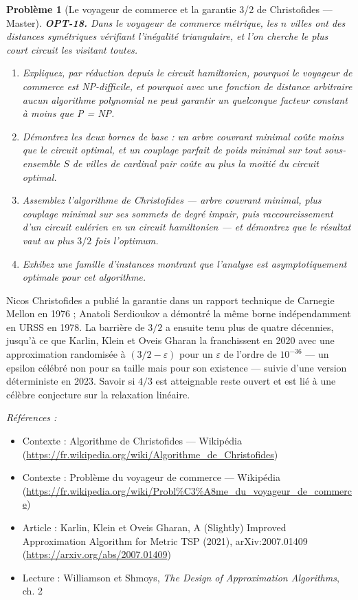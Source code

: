 \documentclass[11pt]{article}
\newtheorem{problem}{Problème}
\newenvironment{refs}{\par\small\noindent\emph{Références :}\begin{itemize}\setlength\itemsep{0pt}}{\end{itemize}\normalsize}
\begin{document}
\bigskip

\begin{problem}[{Le voyageur de commerce et la garantie 3/2 de Christofides --- Master}]
\textbf{OPT-18.} Dans le voyageur de commerce métrique, les $n$ villes ont des distances symétriques vérifiant l'inégalité triangulaire, et l'on cherche le plus court circuit les visitant toutes.
\begin{enumerate}
\item[(a)] Expliquez, par réduction depuis le circuit hamiltonien, pourquoi le voyageur de commerce est NP-difficile, et pourquoi avec une fonction de distance \textit{arbitraire} aucun algorithme polynomial ne peut garantir un quelconque facteur constant à moins que P = NP.
\item[(b)] Démontrez les deux bornes de base : un arbre couvrant minimal coûte moins que le circuit optimal, et un couplage parfait de poids minimal sur tout sous-ensemble $S$ de villes de cardinal pair coûte au plus la moitié du circuit optimal.
\item[(c)] Assemblez l'algorithme de Christofides --- arbre couvrant minimal, plus couplage minimal sur ses sommets de degré impair, puis raccourcissement d'un circuit eulérien en un circuit hamiltonien --- et démontrez que le résultat vaut au plus $3/2$ fois l'optimum.
\item[(d)] Exhibez une famille d'instances montrant que l'analyse est asymptotiquement optimale pour cet algorithme.
\end{enumerate}

\end{problem}

\noindent Nicos Christofides a publié la garantie dans un rapport technique de Carnegie Mellon en 1976 ; Anatoli Serdioukov a démontré la même borne indépendamment en URSS en 1978. La barrière de $3/2$ a ensuite tenu plus de quatre décennies, jusqu'à ce que Karlin, Klein et Oveis Gharan la franchissent en 2020 avec une approximation randomisée à $(3/2 - \varepsilon)$ pour un $\varepsilon$ de l'ordre de $10^{-36}$ --- un epsilon célébré non pour sa taille mais pour son existence --- suivie d'une version déterministe en 2023. Savoir si $4/3$ est atteignable reste ouvert et est lié à une célèbre conjecture sur la relaxation linéaire.

\begin{refs}
\item Contexte : Algorithme de Christofides --- Wikipédia (\url{https://fr.wikipedia.org/wiki/Algorithme_de_Christofides})
\item Contexte : Problème du voyageur de commerce --- Wikipédia (\url{https://fr.wikipedia.org/wiki/Probl%C3%A8me_du_voyageur_de_commerce})
\item Article : Karlin, Klein et Oveis Gharan, \og{} A (Slightly) Improved Approximation Algorithm for Metric TSP \fg{} (2021), arXiv:2007.01409 (\url{https://arxiv.org/abs/2007.01409})
\item Lecture : Williamson et Shmoys, \textit{The Design of Approximation Algorithms}, ch. 2
\end{refs}
\end{document}
